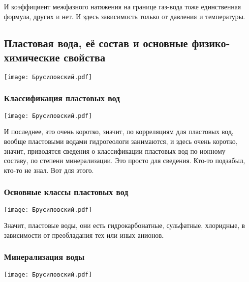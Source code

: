 \documentclass[main.tex]{subfiles}
\begin{document}
И коэффициент межфазного натяжения на границе газ-вода тоже единственная формула, других и нет.
И здесь зависимость только от давления и температуры.

\subsection[\underline{\textbf{Пластовая вода, её состав и основные физико-химические свойства}}]{Пластовая вода, её состав и основные физико-химические свойства}

\begin{center}
\texttt{[image: Брусиловский.pdf]}
\end{center}



\subsubsection{Классификация пластовых вод}

\begin{center}
\texttt{[image: Брусиловский.pdf]}
\end{center}

И последнее, это очень коротко, значит, по корреляциям для пластовых вод, вообще пластовыми водами гидрогеологи занимаются, и здесь очень коротко, значит, приводятся сведения о классификации пластовых вод по ионному составу, по степени минерализации.
Это просто для сведения.
Кто-то подзабыл, кто-то не знал.
Вот для этого.

\subsubsection{Основные классы пластовых вод}

\begin{center}
\texttt{[image: Брусиловский.pdf]}
\end{center}

Значит, пластовые воды, они есть гидрокарбонатные, сульфатные, хлоридные, в зависимости от преобладания тех или иных анионов.

\subsubsection{Минерализация воды}

\begin{center}
\texttt{[image: Брусиловский.pdf]}
\end{center}
\end{document}
